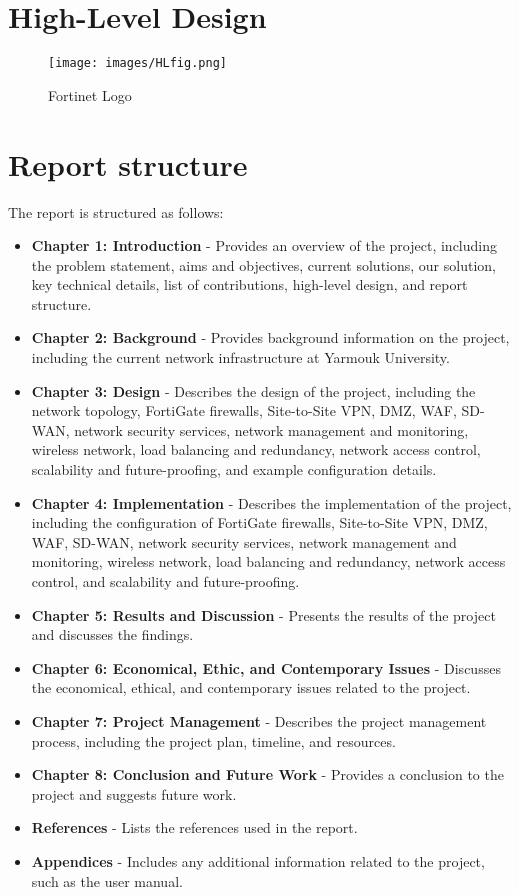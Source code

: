 \documentclass[12pt]{report}
\begin{document}
\newpage
\section{High-Level Design}
\begin{figure}[h]
    \centering
    \texttt{[image: images/HLfig.png]}
    \caption{Fortinet Logo}
    \label{fig:High Level Design}
\end{figure}


\section{Report structure}
The report is structured as follows:
\begin{itemize}
    \item \textbf{Chapter 1: Introduction} - Provides an overview of the project, including the problem statement, aims and objectives, current solutions, our solution, key technical details, list of contributions, high-level design, and report structure.
    \item \textbf{Chapter 2: Background} - Provides background information on the project, including the current network infrastructure at Yarmouk University.
    \item \textbf{Chapter 3: Design} - Describes the design of the project, including the network topology, FortiGate firewalls, Site-to-Site VPN, DMZ, WAF, SD-WAN, network security services, network management and monitoring, wireless network, load balancing and redundancy, network access control, scalability and future-proofing, and example configuration details.
    \item \textbf{Chapter 4: Implementation} - Describes the implementation of the project, including the configuration of FortiGate firewalls, Site-to-Site VPN, DMZ, WAF, SD-WAN, network security services, network management and monitoring, wireless network, load balancing and redundancy, network access control, and scalability and future-proofing.
    \item \textbf{Chapter 5: Results and Discussion} - Presents the results of the project and discusses the findings.
    \item \textbf{Chapter 6: Economical, Ethic, and Contemporary Issues} - Discusses the economical, ethical, and contemporary issues related to the project.

    \item \textbf{Chapter 7: Project Management} - Describes the project management process, including the project plan, timeline, and resources.
    \item \textbf{Chapter 8: Conclusion and Future Work} - Provides a conclusion to the project and suggests future work.
    \item \textbf{References} - Lists the references used in the report.
    \item \textbf{Appendices} - Includes any additional information related to the project, such as the user manual.
\end{itemize}
\end{document}

